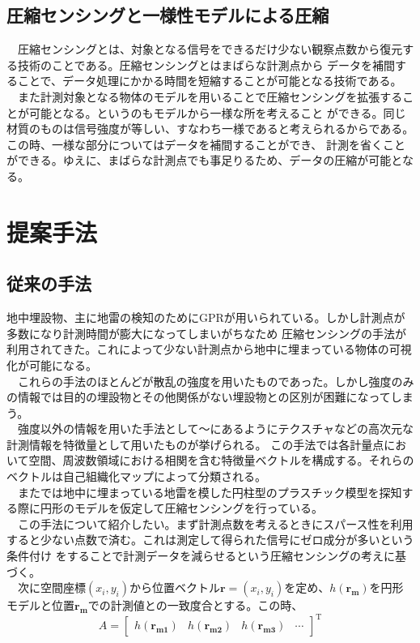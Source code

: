 \documentclass[12pt,a4paper]{jsreport}
\begin{document}
 \section{圧縮センシングと一様性モデルによる圧縮}
　圧縮センシングとは、対象となる信号をできるだけ少ない観察点数から復元する技術のことである。圧縮センシングとはまばらな計測点から
データを補間することで、データ処理にかかる時間を短縮することが可能となる技術である。
\\　また計測対象となる物体のモデルを用いることで圧縮センシングを拡張することが可能となる\cite{imai}。というのもモデルから一様な所を考えること
ができる。同じ材質のものは信号強度が等しい、すなわち一様であると考えられるからである。この時、一様な部分についてはデータを補間することができ、
計測を省くことができる。ゆえに、まばらな計測点でも事足りるため、データの圧縮が可能となる。

\chapter{提案手法}
\section{従来の手法}
地中埋設物、主に地雷の検知のためにGPRが用いられている。しかし計測点が多数になり計測時間が膨大になってしまいがちなため
圧縮センシングの手法が利用されてきた。これによって少ない計測点から地中に埋まっている物体の可視化が可能になる。
\\　これらの手法のほとんどが散乱の強度を用いたものであった。しかし強度のみの情報では目的の埋設物とその他関係がない埋設物との区別が困難になってしまう。
\\　強度以外の情報を用いた手法として\cite{hirose1}～\cite{hirose3}にあるようにテクスチャなどの高次元な計測情報を特徴量として用いたものが挙げられる。
この手法では各計量点において空間、周波数領域における相関を含む特徴量ベクトルを構成する。それらのベクトルは自己組織化マップによって分類される。
\\　また\cite{imai}では地中に埋まっている地雷を模した円柱型のプラスチック模型を探知する際に円形のモデルを仮定して圧縮センシングを行っている。
\\　この手法について紹介したい。まず計測点数を考えるときにスパース性を利用すると少ない点数で済む。これは測定して得られた信号にゼロ成分が多いという条件付け
をすることで計測データを減らせるという圧縮センシングの考えに基づく。
\\　次に空間座標$(x_{i},y_{i})$から位置ベクトル$\bm{r}=(x_{i},y_{i})$を定め、$h(\bm{r_{m}})$を円形モデルと位置$\bm{r_{m}}$での計測値との一致度合とする。この時、
\begin{equation}
  A =
      \left[
      \begin{array}{rrrr}
      h(\bm{r_{m1}})&h(\bm{r_{m2}})&h(\bm{r_{m3}})&\cdots
      \end{array}
      \right]^\mathrm{T}
  \end{equation}
\end{document}
